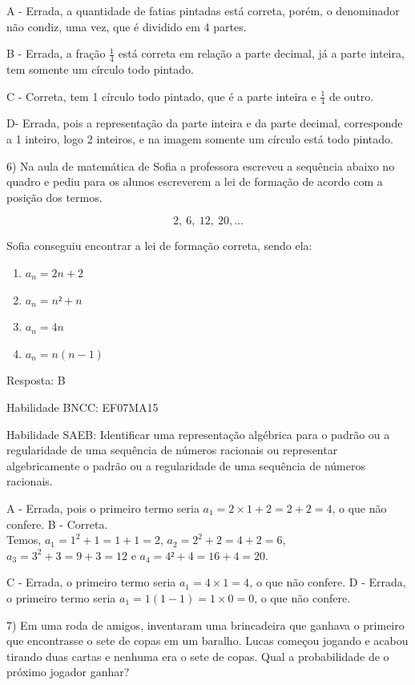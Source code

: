 A - Errada, a quantidade de fatias pintadas está correta, porém, o
denominador não condiz, uma vez, que é dividido em 4 partes.

B - Errada, a fração \(\frac{1}{4}\) está correta em relação a parte
decimal, já a parte inteira, tem somente um círculo todo pintado.

C - Correta, tem 1 círculo todo pintado, que é a parte inteira e
\(\frac{1}{4}\) de outro.

D- Errada, pois a representação da parte inteira e da parte decimal,
corresponde a 1 inteiro, logo 2 inteiros, e na imagem somente um círculo
está todo pintado.

6) Na aula de matemática de Sofia a professora escreveu a sequência
abaixo no quadro e pediu para os alunos escreverem a lei de formação de
acordo com a posição dos termos.

\[2,\ 6,\ 12,\ 20,\ldots\]

Sofia conseguiu encontrar a lei de formação correta, sendo ela:

\begin{enumerate}
\def\labelenumi{\alph{enumi})}
\item
  \(a_{n} = 2n + 2\)
\item
  \(a_{n} = n² + n\)
\item
  \(a_{n} = 4n\)
\item
  \(a_{n} = n(n - 1)\)
\end{enumerate}

Resposta: B

Habilidade BNCC: EF07MA15

Habilidade SAEB: Identificar uma representação algébrica para o padrão
ou a regularidade de uma sequência de números racionais ou representar
algebricamente o padrão ou a regularidade de uma sequência de números
racionais.

A - Errada, pois o primeiro termo seria
\(a_{1} = 2 \times 1 + 2 = 2 + 2 = 4\), o que não confere. B -
Correta.\\
Temos, \(a_{1} = 1^{2} + 1 = 1 + 1 = 2\),
\(a_{2} = 2^{2} + 2 = 4 + 2 = 6\), \(a_{3} = 3^{2} + 3 = 9 + 3 = 12\) e
\(a_{4} = 4² + 4 = 16 + 4 = 20\).

C - Errada, o primeiro termo seria \(a_{1} = 4 \times 1 = 4\)\emph{,} o
que não confere.\emph{\hfill\break
}D - Errada, o primeiro termo seria
\(a_{1} = 1\left( 1 - 1 \right) = 1 \times 0 = 0\), o que não confere.

7) Em uma roda de amigos, inventaram uma brincadeira que ganhava o
primeiro que encontrasse o sete de copas em um baralho. Lucas começou
jogando e acabou tirando duas cartas e nenhuma era o sete de copas. Qual
a probabilidade de o próximo jogador ganhar?

